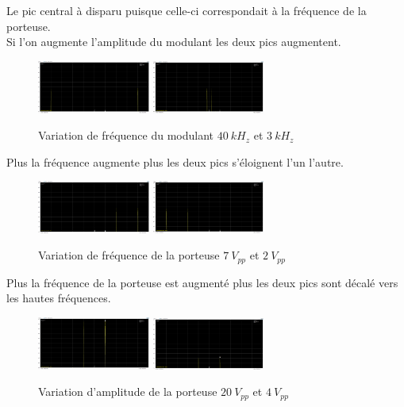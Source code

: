 \documentclass[11pt, openright]{book}
\begin{document}
Le pic central à disparu puisque celle-ci correspondait à la fréquence de la porteuse.\\
Si l'on augmente l'amplitude du modulant les deux pics augmentent.

\begin{figure}[ht]
    \centering
    \includegraphics[width=0.33\textwidth]{./object/g17.png}
    \includegraphics[width=0.33\textwidth]{./object/g18.png}
    \caption{Variation de fréquence du modulant $40\ kH_z$ et $3\ kH_z$}
\end{figure}

Plus la fréquence augmente plus les deux pics s'éloignent l'un l'autre.

\begin{figure}[ht]
    \centering
    \includegraphics[width=0.33\textwidth]{./object/g19.png}
    \includegraphics[width=0.33\textwidth]{./object/g20.png}
    \caption{Variation de fréquence de la porteuse $7\ V_{pp}$ et $2\ V_{pp}$}
\end{figure}

Plus la fréquence de la porteuse est augmenté plus les deux pics sont décalé vers les hautes fréquences.

\begin{figure}[ht!]
    \centering
    \includegraphics[width=0.33\textwidth]{./object/g21.png}
    \includegraphics[width=0.33\textwidth]{./object/g22.png}
    \caption{Variation d'amplitude de la porteuse $20\ V_{pp}$ et $4\ V_{pp}$}
\end{figure}
\end{document}
